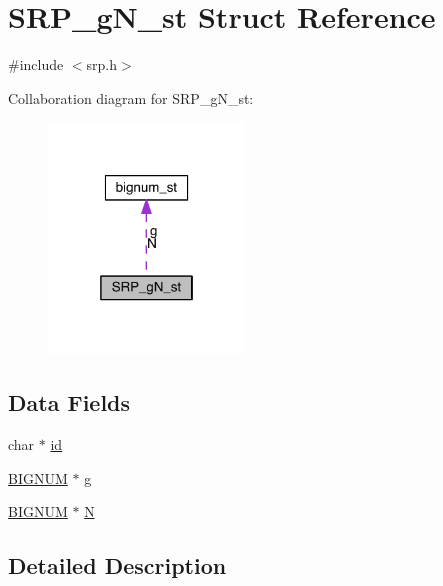 \hypertarget{struct_s_r_p__g_n__st}{}\section{S\+R\+P\+\_\+g\+N\+\_\+st Struct Reference}
\label{struct_s_r_p__g_n__st}


{\ttfamily \#include $<$srp.\+h$>$}



Collaboration diagram for S\+R\+P\+\_\+g\+N\+\_\+st\+:\nopagebreak
\begin{figure}[H]
\begin{center}
\leavevmode
\includegraphics[width=148pt]{struct_s_r_p__g_n__st__coll__graph}
\end{center}
\end{figure}
\subsection*{Data Fields}
\begin{DoxyCompactItemize}
\item 
char $\ast$ \hyperlink{struct_s_r_p__g_n__st_a0478f7cd8e97b1656f1b7a03ced467c4}{id}
\item 
\hyperlink{crypto_2ossl__typ_8h_a6fb19728907ec6515e4bfb716bffa141}{B\+I\+G\+N\+UM} $\ast$ \hyperlink{struct_s_r_p__g_n__st_a13fc89a0daf188f7de9a2011bc9b051f}{g}
\item 
\hyperlink{crypto_2ossl__typ_8h_a6fb19728907ec6515e4bfb716bffa141}{B\+I\+G\+N\+UM} $\ast$ \hyperlink{struct_s_r_p__g_n__st_aea6e731e3cc1aef110a1dbd1545eeff0}{N}
\end{DoxyCompactItemize}


\subsection{Detailed Description}


